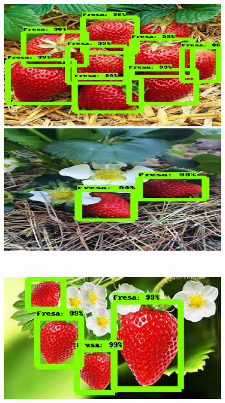   \begin{figure}[H]
  \centering
  \begin{minipage}{0.45\textwidth}
    \centering
    \includegraphics[width=\linewidth]{figs/999.jpeg}
  \end{minipage}
  \hspace{2mm}
  \begin{minipage}{0.45\textwidth}
    \centering
    \includegraphics[width=\linewidth]{figs/947.jpeg}
  \end{minipage}
  \\[4mm] %
  \begin{minipage}{0.45\textwidth}
    \centering
    \includegraphics[width=\linewidth]{figs/868.jpeg}

\end{minipage}
\end{figure}
